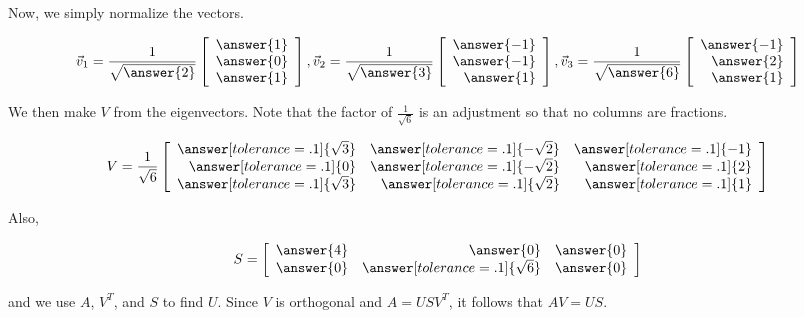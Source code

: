 \documentclass{ximera}
\begin{document}
\begin{example}
Now, we simply normalize the vectors.

\[ \vec{v}_1=\frac{1}{\sqrt{\answer{2}}}\left[\begin{array}{r} \answer{1}\\ \answer{0}\\ \answer{1} \end{array}\right],
\vec{v}_2=\frac{1}{\sqrt{\answer{3}}}\left[\begin{array}{r} \answer{-1}\\ \answer{-1}\\ \answer{1} \end{array}\right],
\vec{v}_3=\frac{1}{\sqrt{\answer{6}}}\left[\begin{array}{r} \answer{-1}\\ \answer{2}\\ \answer{1} \end{array}\right]\]

We then make $V$ from the eigenvectors. Note that the factor of $\frac{1}{\sqrt{6}}$ is an adjustment so that no columns are fractions.

\[ V=\frac{1}{\sqrt{6}}\left[\begin{array}{rrr}
  \answer[tolerance=.1]{\sqrt{3}} & \answer[tolerance=.1]{-\sqrt{2}} & \answer[tolerance=.1]{-1}  \\
\answer[tolerance=.1]{0} & \answer[tolerance=.1]{-\sqrt{2}} & \answer[tolerance=.1]{2} \\
\answer[tolerance=.1]{\sqrt{3}} & \answer[tolerance=.1]{\sqrt{2}} & \answer[tolerance=.1]{1} \end{array}\right]\]

Also,

\[ S = \left[\begin{array}{rrr} \answer{4} & \answer{0} & \answer{0} \\
\answer{0} & \answer[tolerance=.1]{\sqrt{6}} & \answer{0} \end{array}\right]\]


and we use $A$, $V^T$, and $S$ to find $U$. Since $V$ is orthogonal and $A=US V^T$, it follows that $AV=US$.


\end{example}
\end{document}
